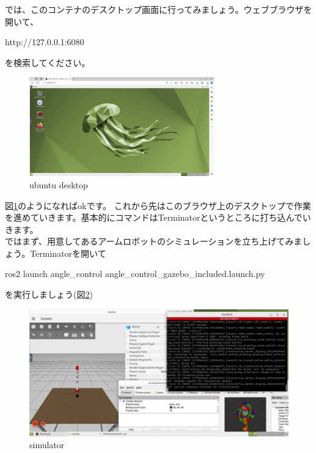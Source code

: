 \documentclass[a4paper,10pt]{jsarticle}
\begin{document}
では、このコンテナのデスクトップ画面に行ってみましょう。ウェブブラウザを開いて、
\begin{center}
  http://127.0.0.1:6080
\end{center}
を検索してください。\\
\begin{figure}[ht]
  \begin{center}
    \includegraphics[width=8cm]{pictures/webbrouser.png}
    \caption{ubuntu desktop}
    \label{ubuntudesktop}
  \end{center}
\end{figure}

図\ref{ubuntudesktop}のようになればokです。
これから先はこのブラウザ上のデスクトップで作業を進めていきます。基本的にコマンドはTerminatorというところに打ち込んでいきます。\\
ではまず、用意してあるアームロボットのシミュレーションを立ち上げてみましょう。Terminatorを開いて
\begin{center}
  ros2 launch angle\_control angle\_control\_gazebo\_included.launch.py
  \label{launchcode}
\end{center}
を実行しましょう(図\ref{launch})\\
\begin{figure}[ht]
  \begin{center}
    \includegraphics[width=12cm]{pictures/launch.png}
    \caption{simulator}
    \label{launch}
  \end{center}
\end{figure}
\end{document}
